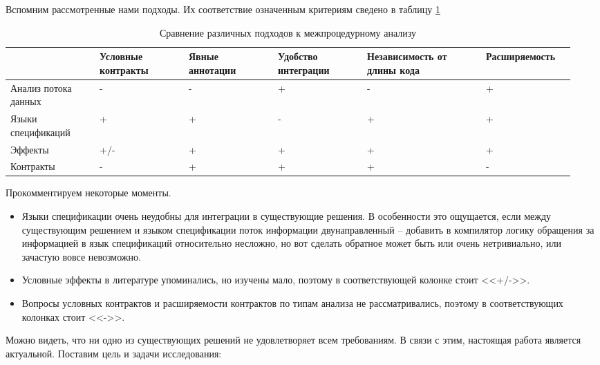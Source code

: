 Вспомним рассмотренные нами подходы. Их соответствие означенным критериям сведено в таблицу \ref{approaches-analysis}

\begin{table}
\begin{tabular}{ | p{0.15\linewidth} | p{0.15\linewidth} | p{0.15\linewidth} | p{0.15\linewidth} | p{0.20\linewidth} | p{0.15\linewidth} | }
	\hline
					     & Условные контракты & Явные аннотации            & Удобство интеграции & Независимость от длины кода & Расширяемость \\\hline
	
	Анализ потока данных & 	-				  & -						   & +					 & -						   & + 			   \\\hline
	
	Языки спецификаций   & +				  & +						   & -					 & +						   & +			   \\\hline
	
	Эффекты			     & +/- 				  & +						   & +					 & +						   & +   		   \\\hline
	
	Контракты		     & - 				  & +						   & +					 & +						   & -			   \\\hline
\end{tabular}
\label{approaches-analysis}
\caption{Сравнение различных подходов к межпроцедурному анализу}
\end{table}

Прокомментируем некоторые моменты. 

\begin{itemize}
	\item Языки спецификации очень неудобны для интеграции в существующие решения. В особенности это ощущается, если между существующим решением и языком спецификации поток информации двунаправленный -- добавить в компилятор логику обращения за информацией в язык спецификаций относительно несложно, но вот сделать обратное может быть или очень нетривиально, или зачастую вовсе невозможно. 
	
	\item Условные эффекты в литературе упоминались, но изучены мало, поэтому в соответствующей колонке стоит <<+/->>. 
	
	\item Вопросы условных контрактов и расширяемости контрактов по типам анализа не рассматривались, поэтому в соответствующих колонках стоит <<->>.
\end{itemize}

Можно видеть, что ни одно из существующих решений не удовлетворяет всем требованиям. В связи с этим, настоящая работа является актуальной. Поставим цель и задачи исследования:


